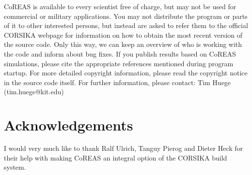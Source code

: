 \documentclass[a4paper,10pt]{article}
\begin{document}
CoREAS is available to every scientist free of charge, but may not be used for commercial or military applications. You may not distribute the program or parts of it to other interested persons, but instead are asked to refer them to the official CORSIKA webpage for information on how to obtain the most recent version of the source code. Only this way, we can keep an overview of who is working with the code and inform about bug fixes. If you publish results based on CoREAS simulations, please cite the appropriate references mentioned during program startup. For more detailed copyright information, please read the copyright notice in the source code itself. For further information, please contact: Tim Huege (tim.huege@kit.edu)

\section*{Acknowledgements}

I would very much like to thank Ralf Ulrich, Tanguy Pierog and Dieter Heck for their help with making CoREAS an integral option of the CORSIKA build system.

%
%
\end{document}
